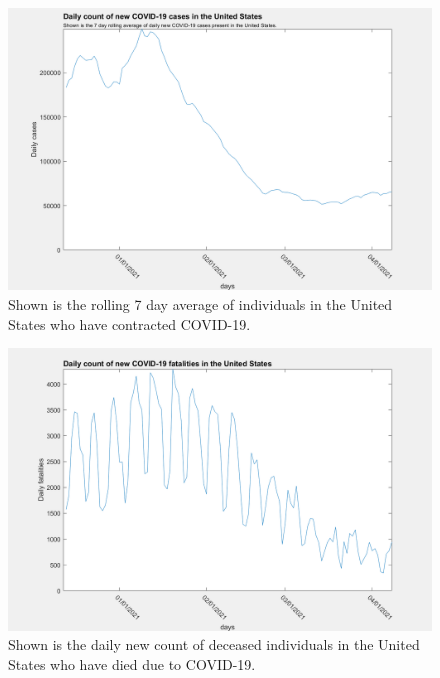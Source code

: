 \documentclass[twoside]{article}
\begin{document}
\begin{multicols}{2}
\begin{figure}[H]
	\includegraphics[width=\linewidth]{images/usa_daily_cases_processed.png}
	\caption{Shown is the rolling 7 day average of individuals in the United States who have contracted COVID-19.}
	\label{fig:images/usa_daily_cases_processedLabel}
\end{figure}

\begin{figure}[H]
	\includegraphics[width=\linewidth]{images/usa_daily_fatalities_unprocessed.png}
	\caption{Shown is the daily new count of deceased individuals in the United States who have died due to COVID-19.}
	\label{fig:images/usa_daily_fatalities_unprocessedLabel}
\end{figure}


\end{multicols}
\end{document}

